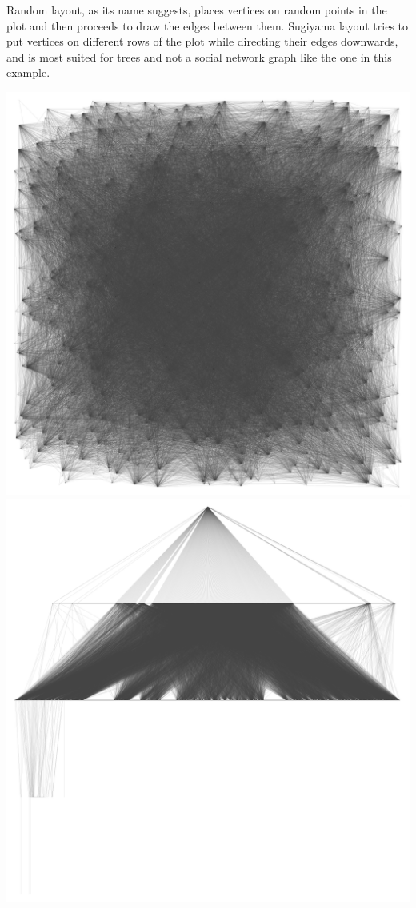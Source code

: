 \documentclass[12pt, a4paper]{article}
\begin{document}
Random layout, as its name suggests, places vertices on random points in the plot and then proceeds to draw the edges between them. Sugiyama layout tries to put vertices on different rows of the plot while directing their edges downwards, and is most suited for trees and not a social network graph like the one in this example.

\begin{multicols}{2}
  {\centering
  \includegraphics[width=\columnwidth]{src/youtube/hdg/comp/8_plot_random}\\
  \label{fig:hdg_c8}}
  {\centering
  \includegraphics[width=\columnwidth]{src/youtube/hdg/comp/9_plot_sgy}
  \label{fig:hdg_c9}}
\end{multicols}
\end{document}
